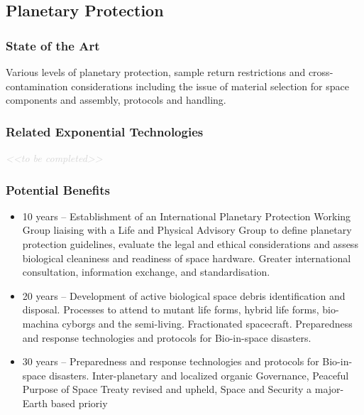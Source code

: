 \documentclass[letter,11pt]{article}
\newcommand{\todo}[1]{\textcolor{lightgray}{\textit{<<#1>>}}}
\newcommand{\tbc}{\begin{center} \todo{to be completed} \end{center}}
\newcommand{\tbcsubsubsection}[1]{ \refstepcounter{subsubsection}%
  \subsubsection*{\thesubsubsection \quad #1} \tbc}
\begin{document}
\subsection{Planetary Protection}

\subsubsection{State of the Art}

Various levels of planetary protection, sample return restrictions and
cross-contamination considerations including the issue of material selection
for space components and assembly, protocols and handling.

\tbcsubsubsection{Related Exponential Technologies}

\subsubsection{Potential Benefits}

\begin{itemize}
	\item 10 years -- Establishment of an International Planetary Protection
		Working Group liaising with a Life and Physical Advisory Group to define
		planetary protection guidelines, evaluate the legal and ethical
		considerations and assess biological cleaniness and readiness of space
		hardware. Greater international consultation, information exchange, and
		standardisation.

	\item 20 years -- Development of active biological space debris
		identification and disposal. Processes to attend to mutant life forms,
		hybrid life forms, bio-machina cyborgs and the semi-living. Fractionated
		spacecraft. Preparedness and response technologies and protocols for
		Bio-in-space disasters.

	\item 30 years -- Preparedness and response technologies and protocols for
		Bio-in-space disasters. Inter-planetary and localized organic Governance,
		Peaceful Purpose of Space Treaty revised and upheld, Space and Security a
		major-Earth based prioriy
\end{itemize}
\end{document}
